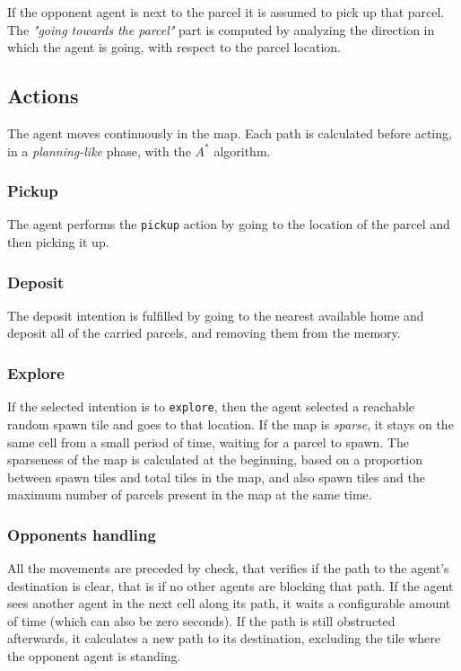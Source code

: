 If the opponent agent is next to the parcel it is assumed to pick up that parcel. The \textit{"going towards the parcel"} part is computed by analyzing the direction in which the agent is going, with respect to the parcel location.



\subsection{Actions}

The agent moves continuously in the map. Each path is calculated before acting, in a \textit{planning-like} phase, with the $A^*$ algorithm. 

\subsubsection*{Pickup}
The agent performs the \texttt{pickup} action by going to the location of the parcel and then picking it up.

\subsubsection*{Deposit}
The deposit intention is fulfilled by going to the nearest available home and deposit all of the carried parcels, and removing them from the memory.

\subsubsection*{Explore}
If the selected intention is to \texttt{explore}, then the agent selected a reachable random spawn tile and goes to that location. If the map is \textit{sparse}, it stays on the same cell from a small period of time, waiting for a parcel to spawn.
The sparseness of the map is calculated at the beginning, based on a proportion between spawn tiles and total tiles in the map, and also spawn tiles and the maximum number of parcels present in the map at the same time.

\subsubsection*{Opponents handling}
All the movements are preceded by check, that verifies if the path to the agent's destination is clear, that is if no other agents are blocking that path.
If the agent sees another agent in the next cell along its path, it waits a configurable amount of time (which can also be zero seconds). If the path is still obstructed afterwards, it calculates a new path to its destination, excluding the tile where the opponent agent is standing.

